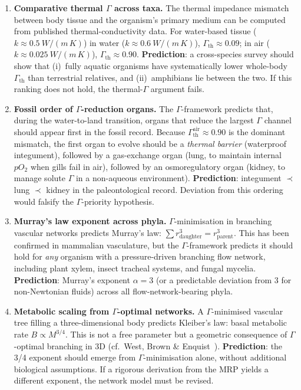 \documentclass[aps,pre,twocolumn,superscriptaddress,floatfix]{revtex4-2}
\begin{document}
\begin{enumerate}
  \item \textbf{Comparative thermal $\Gamma$ across taxa.}
    The thermal impedance mismatch between body tissue and
    the organism's primary medium can be computed from
    published thermal-conductivity data.
    For water-based tissue ($k \approx \SI{0.5}{W/(m\,K)}$)
    in water ($k \approx \SI{0.6}{W/(m\,K)}$),
    $\Gamma_{\text{th}} \approx 0.09$;
    in air ($k \approx \SI{0.025}{W/(m\,K)}$),
    $\Gamma_{\text{th}} \approx 0.90$.
    \textbf{Prediction}: a cross-species survey should show
    that (i)~fully aquatic organisms have systematically
    lower whole-body $\Gamma_{\text{th}}$ than terrestrial
    relatives, and (ii)~amphibians lie between the two.
    If this ranking does not hold, the thermal-$\Gamma$
    argument fails.

  \item \textbf{Fossil order of $\Gamma$-reduction organs.}
    The $\Gamma$-framework predicts that, during the
    water-to-land transition, organs that reduce the
    largest $\Gamma$ channel should appear first in the
    fossil record.  Because
    $\Gamma_{\text{th}}^{\text{air}} \approx 0.90$ is the
    dominant mismatch, the first organ to evolve should be
    a \emph{thermal barrier} (waterproof integument), followed
    by a gas-exchange organ (lung, to maintain internal
    $pO_2$ when gills fail in air), followed by an
    osmoregulatory organ (kidney, to manage solute
    $\Gamma$ in a non-aqueous environment).
    \textbf{Prediction}: integument $\prec$ lung $\prec$ kidney
    in the paleontological record.
    Deviation from this ordering would falsify the
    $\Gamma$-priority hypothesis.

  \item \textbf{Murray's law exponent across phyla.}
    $\Gamma$-minimisation in branching vascular networks
    predicts Murray's law: $\sum r_{\text{daughter}}^3
    = r_{\text{parent}}^3$.  This has been confirmed in
    mammalian vasculature, but the $\Gamma$-framework
    predicts it should hold for \emph{any} organism with
    a pressure-driven branching flow network, including
    plant xylem, insect tracheal systems, and fungal
    mycelia.
    \textbf{Prediction}: Murray's exponent $\alpha = 3$ (or
    a predictable deviation from 3 for non-Newtonian
    fluids) across all flow-network-bearing phyla.

  \item \textbf{Metabolic scaling from $\Gamma$-optimal
    networks.}
    A $\Gamma$-minimised vascular tree filling a
    three-dimensional body predicts Kleiber's law:
    basal metabolic rate $B \propto M^{3/4}$.
    This is not a free parameter but a geometric
    consequence of $\Gamma$-optimal branching in 3D
    (cf.\ West, Brown \& Enquist~\cite{West1997}).
    \textbf{Prediction}: the 3/4 exponent should emerge from
    $\Gamma$-minimisation alone, without additional
    biological assumptions.  If a rigorous derivation
    from the MRP yields a different exponent, the
    network model must be revised.
\end{enumerate}
\end{document}

